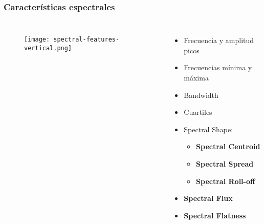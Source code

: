 \begin{frame}
    \frametitle{Características espectrales}

    \begin{columns}

        \begin{figure}[!h]
            \centering
            \texttt{[image: spectral-features-vertical.png]}
        \end{figure}


        \begin{itemize}
            \item<2-> Frecuencia y amplitud picos
            \item<3-> Frecuencias mínima y máxima
            \item<4-> Bandwidth
            \item<5-> Cuartiles
            \item<6-> Spectral Shape:
            \begin{itemize}
                \item \textbf{Spectral Centroid}
                \item \textbf{Spectral Spread}
                \item \textbf{Spectral Roll-off}
            \end{itemize}
            \item<7-> \textbf{Spectral Flux}
            \item<8-> \textbf{Spectral Flatness}
        \end{itemize}

    \end{columns}
\end{frame}

